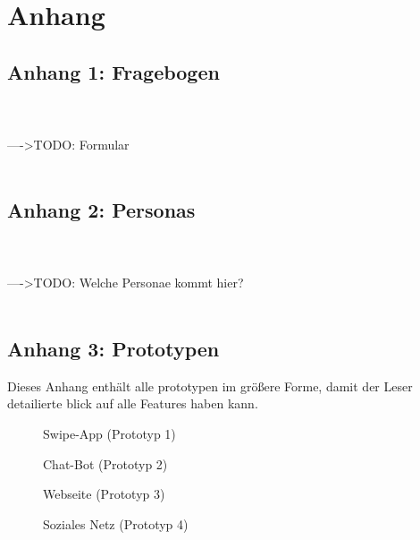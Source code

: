 \chapter{Anhang}
\label{chap:appendix}

\section{Anhang 1: Fragebogen}
\label{anhang:fragebogen}
\\\\---->TODO: Formular\\\\

\section{Anhang 2: Personas}
\label{anhang:personas}
\\\\---->TODO: Welche Personae kommt hier?\\\\

\section{Anhang 3: Prototypen}
\label{anhang:protos}
Dieses Anhang enthält alle prototypen im größere Forme, damit der Leser detailierte blick auf alle Features haben kann.

\begin{figure}[ht]
    \centering
    \caption{Swipe-App (Prototyp 1)}
    \label{fig:prt1}
\end{figure}

\begin{figure}[ht]
    \centering
    \caption{Chat-Bot (Prototyp 2)}
    \label{fig:prt2}
\end{figure}

\begin{figure}[ht]
    \centering
    \caption{Webseite (Prototyp 3)}
    \label{fig:prt3}
\end{figure}

\begin{figure}[ht]
    \centering
    \caption{Soziales Netz (Prototyp 4)}
    \label{fig:prt4}
\end{figure}
